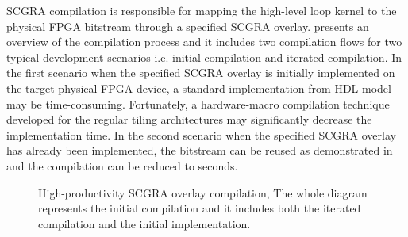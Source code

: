 SCGRA compilation is responsible for mapping the high-level loop 
kernel to the physical FPGA bitstream through a specified SCGRA 
overlay.  presents an overview of the 
compilation process and it includes two compilation flows for two typical
development scenarios i.e. initial compilation and iterated compilation. 
In the first scenario when the specified SCGRA overlay is initially 
implemented on the target physical FPGA device, a standard implementation 
from HDL model may be time-consuming. Fortunately, a hardware-macro compilation 
technique \cite{ROB2014} developed for the regular tiling architectures may 
significantly decrease the implementation time. In the second scenario when 
the specified SCGRA overlay has already been implemented, the bitstream can 
be reused as demonstrated in \cite{scgra} and the compilation can be reduced to seconds.

\begin{figure}[tb]
\caption{High-productivity SCGRA overlay compilation, The whole diagram represents the initial
compilation and it includes both the iterated compilation and the initial implementation.}
\label{fig:horizontal-compilation}
\end{figure}


